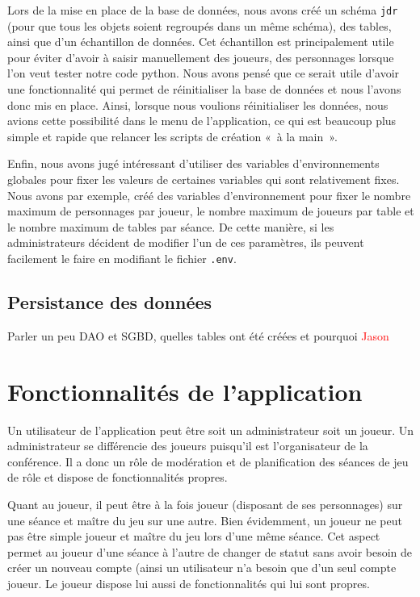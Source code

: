 \documentclass[11pt]{article}
\begin{document}
\bigbreak

Lors de la mise en place de la base de données, nous avons créé un schéma \texttt{jdr} (pour que tous les objets soient regroupés dans un même schéma), des tables, ainsi que d'un échantillon de données. Cet échantillon est principalement utile pour éviter d'avoir à saisir manuellement des joueurs, des personnages lorsque l'on veut tester notre code python. Nous avons pensé que ce serait utile d'avoir une fonctionnalité qui permet de réinitialiser la base de données et nous l'avons donc mis en place. 
Ainsi, lorsque nous voulions réinitialiser les données, nous avions cette possibilité dans le menu de l'application, ce qui est beaucoup plus simple et rapide que relancer les scripts de création «~à la main~».

\bigbreak

Enfin, nous avons jugé intéressant d'utiliser des variables d'environnements globales pour fixer les valeurs de certaines variables qui sont relativement fixes. Nous avons par exemple, créé des variables d'environnement pour fixer le nombre maximum de personnages par joueur, le nombre maximum de joueurs par table et le nombre maximum de tables par séance. De cette manière, si les administrateurs décident de modifier l'un de ces paramètres, ils peuvent facilement le faire en modifiant le fichier \texttt{.env}.


\subsection{Persistance des données}

Parler un peu DAO et SGBD, quelles tables ont été créées et pourquoi
\textcolor{red}{Jason}


\newpage
\section{Fonctionnalités de l'application}

Un utilisateur de l'application peut être soit un administrateur soit un joueur. Un administrateur se différencie des joueurs puisqu'il est l'organisateur de la conférence. Il a donc un rôle de modération et de planification des séances de jeu de rôle et dispose de fonctionnalités propres.

Quant au joueur, il peut être à la fois joueur (disposant de ses personnages) sur une séance et maître du jeu sur une autre. Bien évidemment, un joueur ne peut pas être simple joueur et maître du jeu lors d’une même séance. Cet aspect permet au joueur d’une séance à l’autre de changer de statut sans avoir besoin de créer un nouveau compte (ainsi un utilisateur n’a besoin que d’un seul compte joueur. Le joueur dispose lui aussi de fonctionnalités qui lui sont propres.
\end{document}
